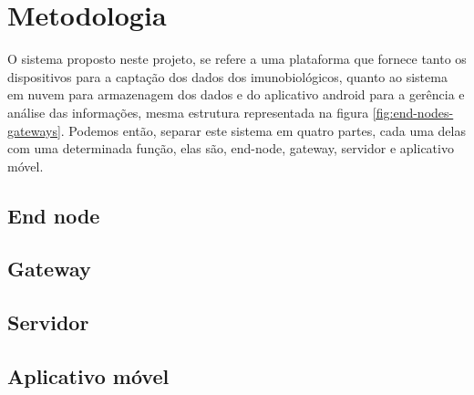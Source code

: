 \chapter{Metodologia}
\label{cap:metodologia}
O sistema proposto neste projeto, se refere a uma plataforma que fornece tanto os dispositivos para a captação dos dados dos imunobiológicos, quanto ao sistema em nuvem para armazenagem dos dados e do aplicativo android para a gerência e análise das informações, mesma estrutura representada na figura \ref{fig:end-nodes-gateways}. Podemos então, separar este sistema em quatro partes, cada uma delas com uma determinada função, elas são, end-node, gateway, servidor e aplicativo móvel.

\section{End node}
\label{metod:node}

\section{Gateway}
\label{metod:gateway}

\section{Servidor}
\label{metod:servidor}

\section{Aplicativo móvel}
\label{metod:app}